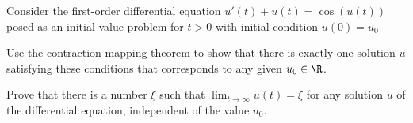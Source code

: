 Consider the first-order differential equation $u'(t)+u(t)=\cos(u(t))$
posed as an initial value problem for $t>0$ with initial condition
$u(0)=u_0$
\begin{alist}
\item Use the contraction mapping theorem to show that there is
exactly one solution $u$ satisfying these conditions that corresponds
to any given $u_0\in \R$.
\item Prove that there is a number $\xi$ such that $\lim_{t\rightarrow
\infty}u(t)=\xi$ for any solution $u$ of the differential equation,
independent of the value $u_0$.
\end{alist}
